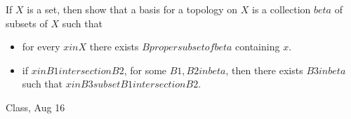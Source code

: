 \begin{samepage}
\begin{ex}
    If $X$ is a set, then show that a basis for a topology on $X$ is a collection $beta$ of subsets of $X$ such that
    \begin{itemize}
        \item for every $x in X$ there exists $B proper subset of beta$ containing $x$.
        \item if $x in B1 intersection B2$, for some $B1, B2 in beta$, then there exists $B3 in beta$ such that $x in B3 subset B1 intersection B2$.
    \end{itemize}
\end{ex}
\begin{source}
    Class, Aug 16
\end{source}
\end{samepage}
